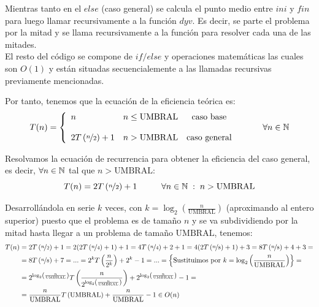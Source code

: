 \documentclass{article}
\newcommand\N{\ensuremath{\mathbb N}\space}
\begin{document}


Mientras tanto en el $else$ (caso general) se calcula el punto medio entre $ini$ y $fin$ para luego llamar recursivamente a la función $dyv$. Es decir, se parte el problema por la mitad y se llama recursivamente a la función para resolver cada una de las mitades. \\



El resto del código se compone de $if/else$ y operaciones matemáticas las cuales son $O(1)$ y están situadas secuencialemente a las llamadas recursivas previamente mencionadas. 

Por tanto, tenemos que la ecuación de la eficiencia teórica es:
\begin{equation} \label{eq:ef_dyv_p1}
    T(n) = \left\{ \begin{array}{lcc} n & n \leq \text{UMBRAL} &\text{caso base} \\ \\ 2T\left(\nicefrac{n}{2}\right) + 1 & n > \text{UMBRAL} & \text{caso general} \\ \end{array} \right. \hspace{10mm} \forall n \in \N
\end{equation}

Resolvamos la ecuación de recurrencia para obtener la eficiencia del caso general, es decir, $\forall n \in \N$ tal que $n > \text{UMBRAL}$:
\begin{equation}
    T(n) = 2T\left(\nicefrac{n}{2}\right) + 1 \hspace{10mm} \forall n \in \N \hspace{1mm} : \hspace{1mm} n > \text{UMBRAL}
\end{equation}

Desarrollándola en serie $k$ veces, con $k = \log_2\left(\frac{n}{\text{UMBRAL}}\right)$ (aproximando al entero superior) puesto que el problema es de tamaño $n$ y se va subdividiendo por la mitad hasta llegar a un problema de tamaño $\text{UMBRAL}$, tenemos:
\begin{align*}
T(n) &= 2T\left(\nicefrac{n}{2}\right) + 1 = 2(2T\left(\nicefrac{n}{4}\right) + 1) + 1 =
4T\left(\nicefrac{n}{4}\right) + 2 + 1 = 4(2T\left(\nicefrac{n}{8}\right) + 1) + 3 = 
8T\left(\nicefrac{n}{8}\right) + 4 + 3 = \\
&=  8T\left(\nicefrac{n}{8}\right) + 7 = ... = 
2^{k}T\left(\frac{n}{2^{k}}\right) + 2^{k} - 1 = ... = \left\{\text{Sustituimos por } k = \log_2\left(\frac{n}{\text{UMBRAL}}\right) \right\} = \\
&= 2^{\log_2\left(\frac{n}{\text{UMBRAL}}\right)}T\left(\frac{n}{2^{\log_2\left(\frac{n}{\text{UMBRAL}}\right)}}\right) + 2^{\log_2\left(\frac{n}{\text{UMBRAL}}\right)} - 1 = \\
&= \frac{n}{\text{UMBRAL}}T\left(\text{UMBRAL}\right) + \frac{n}{\text{UMBRAL}} - 1 \in O(n)
\end{align*}
\end{document}
